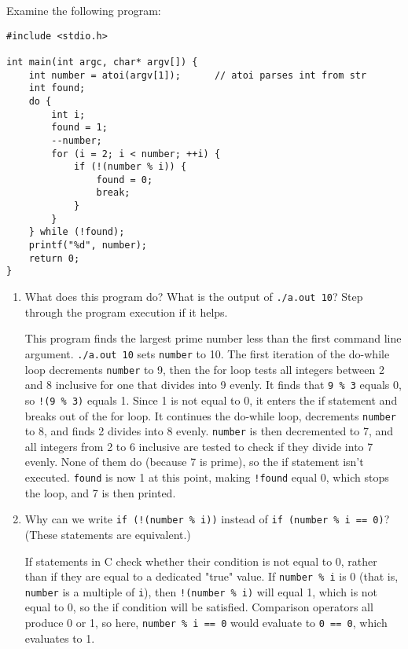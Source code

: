 Examine the following program:

\begin{verbatim}
#include <stdio.h>

int main(int argc, char* argv[]) {
    int number = atoi(argv[1]);      // atoi parses int from str
    int found;
    do {
        int i;
        found = 1;
        --number;
        for (i = 2; i < number; ++i) {
            if (!(number % i)) {
                found = 0;
                break;
            }
        }
    } while (!found);
    printf("%d", number);
    return 0;
}
\end{verbatim}

\begin{enumerate}

\item What does this program do? What is the output of \texttt{./a.out 10}? Step through the program execution if it helps.

\begin{answer}
This program finds the largest prime number less than the first command line argument. \texttt{./a.out 10} sets \texttt{number} to 10. The first iteration of the do-while loop decrements \texttt{number} to 9, then the for loop tests all integers between 2 and 8 inclusive for one that divides into 9 evenly. It finds that \texttt{9 \% 3} equals 0, so \texttt{!(9 \% 3)} equals 1. Since 1 is not equal to 0, it enters the if statement and breaks out of the for loop. It continues the do-while loop, decrements \texttt{number} to 8, and finds 2 divides into 8 evenly. \texttt{number} is then decremented to 7, and all integers from 2 to 6 inclusive are tested to check if they divide into 7 evenly. None of them do (because 7 is prime), so the if statement isn't executed. \texttt{found} is now 1 at this point, making \texttt{!found} equal 0, which stops the loop, and 7 is then printed.
\end{answer}



\item Why can we write \texttt{if (!(number \% i))} instead of \texttt{if (number \% i == 0)}? (These statements are equivalent.)

\begin{answer}
If statements in C check whether their condition is not equal to 0, rather than if they are equal to a dedicated "true" value. If \texttt{number \% i} is 0 (that is, \texttt{number} is a multiple of \texttt{i}), then \texttt{!(number \% i)} will equal 1, which is not equal to 0, so the if condition will be satisfied. Comparison operators all produce 0 or 1, so here, \texttt{number \% i == 0} would evaluate to \texttt{0 == 0}, which evaluates to 1.
\end{answer}




\end{enumerate}
